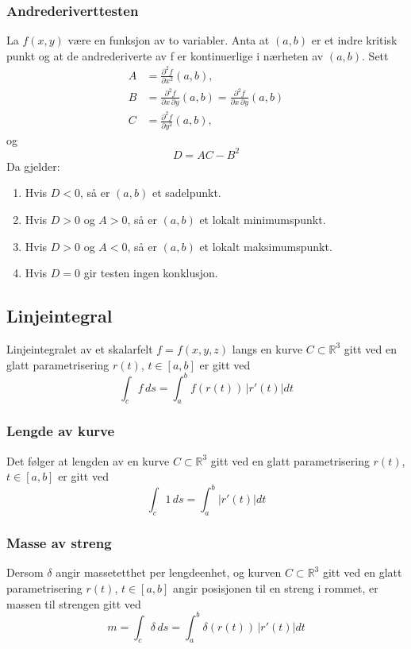 \documentclass{article}
\begin{document}
\subsubsection{Andrederiverttesten}
La $f(x, y)$ være en funksjon av to variabler. Anta at $(a, b)$ er et indre kritisk punkt og at de andrederiverte av f er kontinuerlige i nærheten av $(a, b)$. Sett
\begin{align*}
    A &= \frac{\partial^2 f}{\partial x^2} (a, b),\\
    B &= \frac{\partial^2 f}{\partial x\,\partial y} (a, b) = \frac{\partial^2 f}{\partial x\,\partial y} (a, b)\\
    C &= \frac{\partial^2 f}{\partial y^2} (a, b),
\end{align*}
og
\[D = AC-B^2\]
Da gjelder:
\begin{enumerate}
    \item Hvis $D < 0$, så er $(a, b)$ et sadelpunkt.
    \item Hvis $D > 0$ og $A > 0$, så er $(a, b)$ et lokalt minimumspunkt.
    \item Hvis $D > 0$ og $A < 0$, så er $(a, b)$ et lokalt maksimumspunkt.
    \item Hvis $D = 0$ gir testen ingen konklusjon.
\end{enumerate}


\subsection{Linjeintegral}
Linjeintegralet av et skalarfelt $f = f(x, y, z)$ langs en kurve $C \subset \mathbb{R}^3$ gitt ved en glatt parametrisering $r(t)$, $t \in [a,b]$ er gitt ved
\[\int_c f\,ds = \int_a^b f(r(t))\,\left| r'(t) \right| dt\]
\subsubsection{Lengde av kurve}
Det følger at lengden av en kurve $C \subset \mathbb{R}^3$ gitt ved en glatt parametrisering $r(t)$, $t \in [a,b]$ er gitt ved
\[\int_c 1\,ds = \int_a^b \left| r'(t) \right| dt\]
\subsubsection{Masse av streng}
Dersom $\delta$ angir massetetthet per lengdeenhet, og kurven $C \subset \mathbb{R}^3$ gitt ved en glatt parametrisering $r(t)$, $t \in [a,b]$ angir posisjonen til en streng i rommet, er massen til strengen gitt ved
\[m = \int_c \delta\,ds = \int_a^b \delta (r(t))\,\left| r'(t) \right| dt\]
\end{document}
